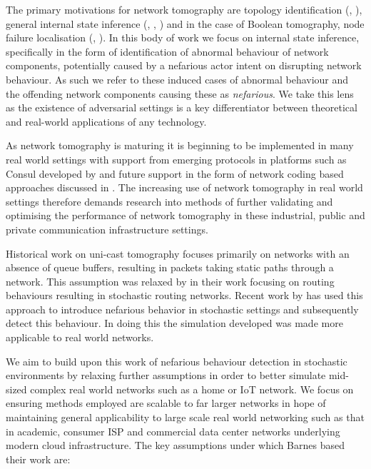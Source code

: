 The primary motivations for network tomography are topology identification (\cite{zhang_topology_2014}, \cite{hailiang_network_2009}), general internal state inference (\cite{vardi_network_1996}, \cite{coates_network_2001}, \cite{he_network_2021}) and in the case of Boolean tomography, node failure localisation (\cite{nguyen_boolean_2007}, \cite{ma_optimal_2015}). In this body of work we focus on internal state inference, specifically in the form of identification of abnormal behaviour of network components, potentially caused by a nefarious actor intent on disrupting network behaviour. As such we refer to these induced cases of abnormal behaviour and the offending network components causing these as \textit{nefarious}. We take this lens as the existence of adversarial settings is a key differentiator between theoretical and real-world applications of any technology.\par
As network tomography is maturing it is beginning to be implemented in many real world settings with support from emerging protocols in platforms such as Consul developed by \cite{shilton_network_2021} and future support in the form of network coding based approaches discussed in \cite{kakkavas_review_2020}. The increasing use of network tomography in real world settings therefore demands research into methods of further validating and optimising the performance of network tomography in these industrial, public and private  communication infrastructure settings.\par
Historical work on uni-cast tomography focuses primarily on networks with an absence of queue buffers, resulting in packets taking static paths through a network. This assumption was relaxed by \cite{lai_measuring_2000} in their work focusing on routing behaviours resulting in stochastic routing networks. Recent work by \cite{barnes_stochastic_2020} has used this approach to introduce nefarious behavior in stochastic settings and subsequently detect this behaviour. In doing this the simulation developed was made more applicable to real world networks.\par
We aim to build upon this work of nefarious behaviour detection in stochastic environments by relaxing further assumptions in order to better simulate mid-sized complex real world networks such as a home or IoT network. We focus on ensuring methods employed are scalable to far larger networks in hope of maintaining general applicability to large scale real world networking such as that in academic, consumer ISP and commercial data center networks underlying modern cloud infrastructure. The key assumptions under which Barnes based their work are:\par
